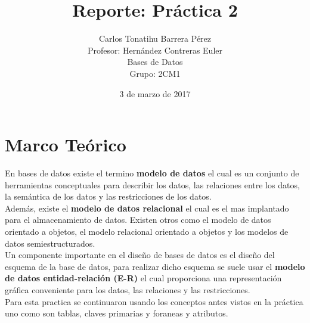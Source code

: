 \documentclass[12pt, titlepage]{article}
\title{Reporte: Práctica 2}
\author{Carlos Tonatihu Barrera Pérez \\ Profesor: Hernández Contreras Euler \\ Bases de Datos \\ Grupo: 2CM1 }
\date{3 de marzo de 2017}
\begin{document}
    \maketitle
    \tableofcontents
    \section{Marco Teórico}
    En bases de datos existe el termino \textbf{modelo de datos} el cual es un conjunto de herramientas conceptuales para describir los datos, las relaciones entre los datos, la semántica de los datos y las restricciones de los datos.\cite{LIBRO}
    \\
    Además, existe el\textbf{ modelo de datos relacional} el cual es el mas implantado para el almacenamiento de datos. Existen otros como el modelo de datos orientado a objetos, el modelo relacional orientado a objetos y los modelos de datos semiestructurados.
    \\
    Un componente importante en el diseño de bases de datos es el diseño del esquema de la base de datos, para realizar dicho esquema se suele usar el \textbf{modelo de datos entidad-relación (E-R)} el cual proporciona una representación gráfica conveniente para los datos, las relaciones y las restricciones.\cite{LIBRO}
    \\
    Para esta practica se continuaron usando los conceptos antes vistos en la práctica uno como son tablas, claves primarias y foraneas y atributos.
    \newpage
\end{document}
